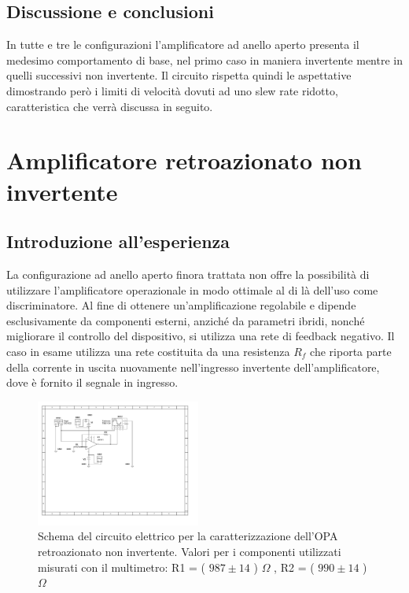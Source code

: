 \documentclass[journal]{IEEEtran}
\begin{document}
\subsection{\textbf{Discussione e conclusioni}}
In tutte e tre le configurazioni l'amplificatore ad anello aperto presenta il medesimo comportamento di base, nel primo caso in maniera invertente mentre in quelli successivi non invertente. Il circuito rispetta quindi le aspettative dimostrando però i limiti di velocità dovuti ad uno slew rate ridotto, caratteristica che verrà discussa in seguito.


\section{\textbf{Amplificatore retroazionato non invertente}} %
\subsection{\textbf{Introduzione all'esperienza}}

La configurazione ad anello aperto finora trattata non offre la possibilità di utilizzare l'amplificatore operazionale in modo ottimale al di là dell'uso come discriminatore. Al fine di ottenere un'amplificazione regolabile e dipende esclusivamente da componenti esterni, anziché da parametri ibridi, nonché migliorare il controllo del dispositivo, si utilizza una rete di feedback negativo.
Il caso in esame utilizza una rete costituita da una resistenza $R_f$ che riporta parte della corrente in uscita nuovamente nell'ingresso invertente dell'amplificatore, dove è fornito il segnale in ingresso.

\begin{figure}[H]%
\begin {center}
\includegraphics[width=0.48\textwidth]{sch-simulations/output/OPA-closed-loop-non-inverting.pdf}
\caption{Schema del circuito elettrico per la caratterizzazione dell'OPA retroazionato non invertente. Valori per i componenti utilizzati misurati con il multimetro: R1 = ( $987 \pm 14$ ) $\Omega$ , R2 = ( $990 \pm 14$ ) $\Omega$
\\}
\label{fig:loop-non-inv}
\end {center}
\end{figure}
\end{document}
